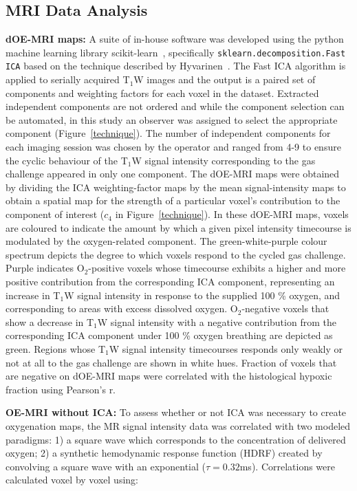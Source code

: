 \subsection{MRI Data Analysis}
\label{doemri_mrianalysis2}
\textbf{dOE-MRI maps:} A suite of in-house software was developed using the python machine learning library scikit-learn~\cite{Pedregosa:2011tv}, specifically \texttt{sklearn.decomposition.Fast \ac{ICA}} based on the technique described by Hyvarinen~\cite{Hyvarinen:2000vk}.
The Fast \ac{ICA} algorithm is applied to serially acquired T$_1$W images and the output is a paired set of components and weighting factors for each voxel in the dataset.
Extracted independent components are not ordered and while the component selection can be automated, in this study an observer was assigned to select the appropriate component (Figure~\ref{technique}).
The number of independent components for each imaging session was chosen by the operator and ranged from 4-9 to ensure the cyclic behaviour of the T$_1$W signal intensity corresponding to the gas challenge appeared in only one component. 
The \ac{dOE-MRI} maps were obtained by dividing the \ac{ICA} weighting-factor maps by the mean signal-intensity maps to obtain a spatial map for the strength of a particular voxel's contribution to the component of interest ($c_4$ in Figure~\ref{technique}).
In these \ac{dOE-MRI} maps, voxels are coloured to indicate the amount by which a given pixel intensity timecourse is modulated by the oxygen-related component.  
The green-white-purple colour spectrum depicts the degree to which voxels respond to the cycled gas challenge.
Purple indicates O$_2$-positive voxels whose timecourse exhibits a higher and more positive contribution from the corresponding \ac{ICA} component, representing an increase in T$_1$W signal intensity in response to the supplied 100 \% oxygen, and corresponding to areas with excess dissolved oxygen. 
O$_2$-negative voxels that show a decrease in T$_1$W signal intensity with a negative contribution from the corresponding \ac{ICA} component under 100 \% oxygen breathing are depicted as green. 
Regions whose T$_1$W signal intensity timecourses responds only weakly or not at all to the gas challenge are shown in white hues.
Fraction of voxels that are negative on \ac{dOE-MRI} maps were correlated with the histological hypoxic fraction using Pearson's r.

\noindent\textbf{OE-MRI without \ac{ICA}:} To assess whether or not \ac{ICA} was necessary to create oxygenation maps, the MR signal intensity data was correlated with two modeled paradigms: 1) a square wave which corresponds to the concentration of delivered oxygen; 2) a synthetic hemodynamic response function (HDRF) created by convolving a square wave with an exponential ($\tau=0.32$ms).
Correlations were calculated voxel by voxel using:

